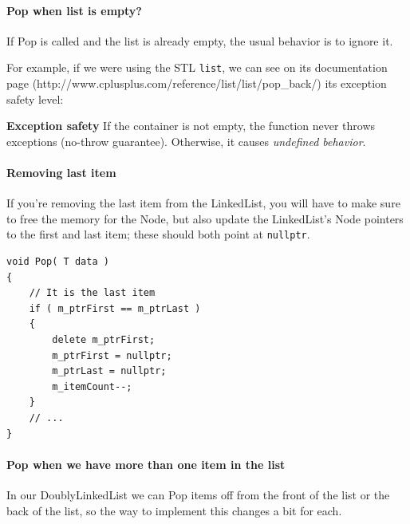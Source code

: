 \documentclass[a4paper,12pt,onepage]{book}
\begin{document}
        \paragraph{Pop when list is empty?}
        
            If Pop is called and the list is already empty, the usual
            behavior is to ignore it.
            
            For example, if we were using the STL \texttt{list},
            we can see on its documentation page
            (http://www.cplusplus.com/reference/list/list/pop\_back/) its
            exception safety level:
            
            \begin{center}
                \begin{mdframed}
                    \textbf{Exception safety}
                    If the container is not empty, the function never 
                    throws exceptions (no-throw guarantee).
                    Otherwise, it causes \textit{undefined behavior}.
                \end{mdframed}
            \end{center}
        
        \paragraph{Removing last item}
        
            If you're removing the last item from the LinkedList, you
            will have to make sure to free the memory for the Node,
            but also update the LinkedList's Node pointers to the 
            first and last item; these should both point at \texttt{nullptr}.
            
\begin{lstlisting}[style=code]
void Pop( T data )
{
    // It is the last item
    if ( m_ptrFirst == m_ptrLast )
    {
        delete m_ptrFirst;
        m_ptrFirst = nullptr;
        m_ptrLast = nullptr;
        m_itemCount--;
    }
    // ...
}
\end{lstlisting}
        
        \newpage
        \paragraph{Pop when we have more than one item in the list}
        
            In our DoublyLinkedList we can Pop items off from the front
            of the list or the back of the list, so the way to
            implement this changes a bit for each.
        
\end{document}

